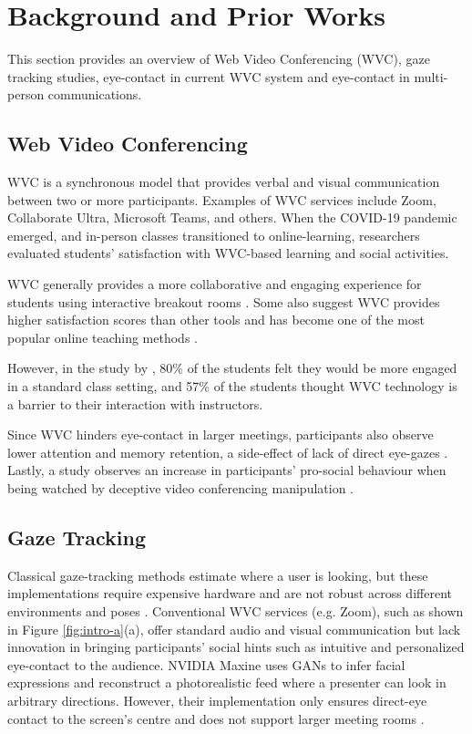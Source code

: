 \section{Background and Prior Works}

This section provides an overview of Web Video Conferencing (WVC), gaze tracking studies, eye-contact in current WVC system and eye-contact in multi-person communications. 

\subsection{Web Video Conferencing}

WVC is a synchronous model that provides verbal and visual communication between two or more participants. Examples of WVC services include Zoom, Collaborate Ultra, Microsoft Teams, and others. When the COVID-19 pandemic emerged, and in-person classes transitioned to online-learning, researchers evaluated students’ satisfaction with WVC-based learning and social activities.

WVC generally provides a more collaborative and engaging experience for students using interactive breakout rooms \cite{article0}. Some also suggest WVC provides higher satisfaction scores than other tools and has become one of the most popular online teaching methods \cite{RN7, RN8}. 

However, in the study by \cite{RN3}, 80\% of the students felt they would be more engaged in a standard class setting, and 57\% of the students thought WVC technology is a barrier to their interaction with instructors. 

Since WVC hinders eye-contact in larger meetings, participants also observe lower attention and memory retention, a side-effect of lack of direct eye-gazes \cite{RN10}. Lastly, a study observes an increase in participants’ pro-social behaviour when being watched by deceptive video conferencing manipulation \cite{RN2}. 


\subsection{Gaze Tracking}


Classical gaze-tracking methods estimate where a user is looking, but these implementations require expensive hardware and are not robust across different environments and poses \cite{RN4, RN5, RN6}. Conventional WVC services (e.g. Zoom), such as shown in Figure \ref{fig:intro-a}(a), offer standard audio and visual communication but lack innovation in bringing participants’ social hints such as intuitive and personalized eye-contact to the audience. NVIDIA Maxine uses GANs to infer facial expressions and reconstruct a photorealistic feed where a presenter can look in arbitrary directions. However, their implementation only ensures direct-eye contact to the screen’s centre and does not support larger meeting rooms \cite{RN11}. 

